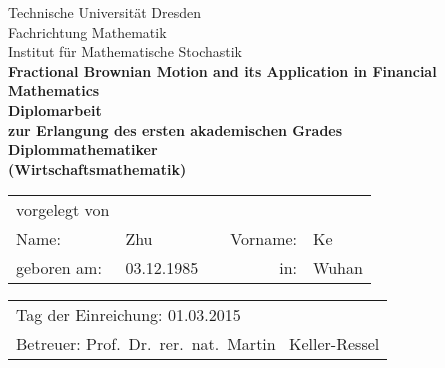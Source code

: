 \begin{titlepage}
	\begin{center}
		\Huge
		Technische Universit\"at Dresden \\[-.4em]
		Fachrichtung Mathematik \\[.5em]
		\Large
		Institut f\"ur Mathematische Stochastik \\[4em]
		\bfseries\huge
		 Fractional Brownian Motion and its Application in Financial Mathematics \\[3em]
		\normalfont\Large
		Diplomarbeit \\
		zur Erlangung des ersten akademischen Grades \\[.5em]
		\bfseries\Large
		Diplommathematiker\\[.5em]
	  	\bfseries\Large
		(Wirtschaftsmathematik)\\[4em]
	\end{center}
	\large
	\begin{tabular}{lllrl}
		vorgelegt von & & & & \\[1.2em]
		Name: & Zhu & \hspace{1.5cm} & Vorname: & Ke \\[.5em]
		geboren am: & 03.12.1985 & & in: & Wuhan \\[3em]
	\end{tabular}
	\newline
	\begin{tabular}{l}
		Tag der Einreichung: \hspace{.5cm} 01.03.2015 \\[.5em]
		Betreuer: \hspace{.5cm} Prof.~Dr.~rer.~nat.~Martin ~Keller-Ressel
	\end{tabular}
\end{titlepage}
\thispagestyle{empty}
\mbox{}
